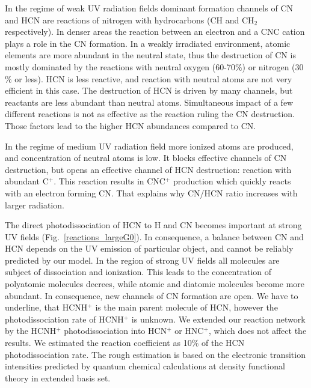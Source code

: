 \documentclass{aa}
\begin{document}
In the regime of weak UV radiation fields dominant formation channels of CN and HCN are reactions of nitrogen with hydrocarbons
(CH and CH$_2$ respectively). In denser areas the reaction between an electron and a CNC cation plays a role in the CN formation. In a weakly irradiated environment, atomic elements are more abundant in the neutral state, thus the destruction of CN is mostly dominated by the
reactions with neutral oxygen (60-70$\%$) or nitrogen (30$\%$ or less). HCN is less reactive, and reaction with neutral atoms are not very efficient in this case. The destruction of HCN is driven by many channels, but reactants are less abundant than neutral atoms. Simultaneous impact of a few different reactions is not as effective as the reaction ruling the CN destruction. Those factors lead to the higher HCN abundances compared to CN.


In the regime of medium UV radiation field more ionized atoms are produced, and concentration of neutral atoms is low. It blocks effective channels of CN destruction, but opens an effective channel of HCN destruction: reaction with abundant C$^+$. This reaction
results in CNC$^+$ production which quickly reacts with an electron forming CN. That explains why CN/HCN ratio increases with larger radiation.

The direct photodissociation of HCN to H and CN becomes important at strong UV fields (Fig.~\ref{reactions_largeG0}). In consequence, a balance between CN and HCN depends on the UV emission of particular object, and cannot be reliably predicted by our model. In the region of strong UV fields all molecules are subject of dissociation and ionization. This leads to the concentration of polyatomic molecules decrees, while atomic and diatomic molecules become more abundant. In consequence, new channels of CN formation are open. We have to underline, that HCNH$^+$ is the main parent molecule of HCN, however the photodissociation rate of HCNH$^+$ is unknown. We extended our reaction network by the HCNH$^+$ photodissociation into HCN$^+$ or HNC$^+$, which does not affect the results. We estimated the reaction coefficient as 10\% of the HCN photodissociation rate. The rough estimation is based on the electronic transition intensities predicted by quantum chemical calculations at density functional theory in extended basis set. 


\end{document}
